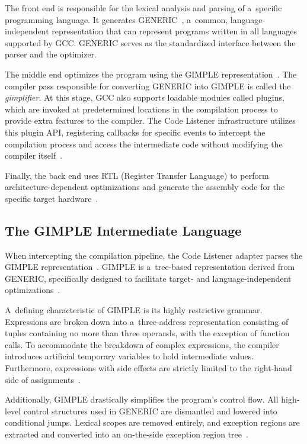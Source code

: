 \documentclass[xpsejal00-gcc-plugin.tex]{subfiles}
\begin{document}
The front end is responsible for the lexical analysis and parsing of a~specific programming language.
It generates GENERIC~\cite{GCCInternals}, a~common, language-independent representation that can represent programs written in all languages supported by GCC.\@
GENERIC serves as the standardized interface between the parser and the optimizer.

The middle end optimizes the program using the GIMPLE representation~\cite{GCCInternals}.
The compiler pass responsible for converting GENERIC into GIMPLE is called the \emph{gimplifier}.
At this stage, GCC also supports loadable modules called plugins, which are invoked at predetermined locations in the compilation process to provide extra features to the compiler.
The Code Listener infrastructure utilizes this plugin API, registering callbacks for specific events to intercept the compilation process and access the intermediate code without modifying the compiler itself~\cite{CodeListener2012}.

Finally, the back end uses RTL (Register Transfer Language) to perform architecture-dependent optimizations and generate the assembly code for the specific target hardware~\cite{GCCInternals}.

\subsection*{The GIMPLE Intermediate Language}\label{sec:gimple}

When intercepting the compilation pipeline, the Code Listener adapter parses the GIMPLE representation~\cite{CodeListener2012}.
GIMPLE is a~tree-based representation derived from GENERIC, specifically designed to facilitate target- and language-independent optimizations~\cite{GCCInternals}.

A~defining characteristic of GIMPLE is its highly restrictive grammar.
Expressions are broken down into a~three-address representation consisting of tuples containing no more than three operands, with the exception of function calls.
To accommodate the breakdown of complex expressions, the compiler introduces artificial temporary variables to hold intermediate values.
Furthermore, expressions with side effects are strictly limited to the right-hand side of assignments~\cite{GCCInternals}.

Additionally, GIMPLE drastically simplifies the program's control flow.
All high-level control structures used in GENERIC are dismantled and lowered into conditional jumps.
Lexical scopes are removed entirely, and exception regions are extracted and converted into an on-the-side exception region tree~\cite{GCCInternals}.
\end{document}
